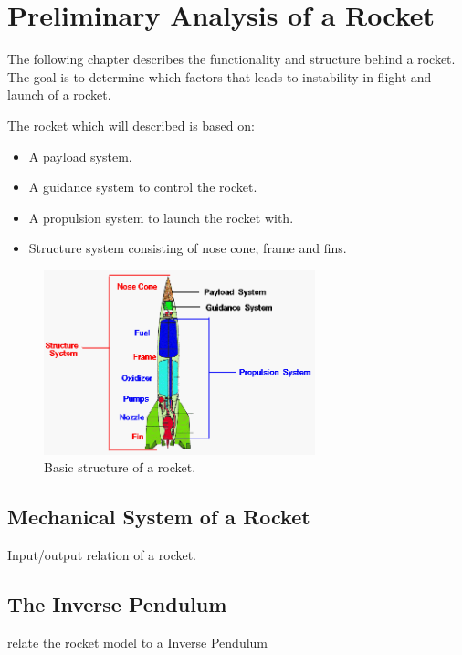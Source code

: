 \chapter{Preliminary Analysis of a Rocket}
The following chapter describes the functionality and structure behind a rocket. The goal is to determine which factors that leads to instability in flight and launch of a rocket. 
\bigbreak

The rocket which will described is based on:
\begin{itemize}[noitemsep]
\item A payload system.
\item A guidance system to control the rocket.
\item A propulsion system to launch the rocket with. 
\item Structure system consisting of nose cone, frame and fins.
\end{itemize}    

\begin{figure}[htbp]
	\centering
 	\includegraphics[width=0.7\textwidth]{figures/RocketStructure.png} 
 	\caption{Basic structure of a rocket.}
 	\label{fig:RocketStructure}
\end{figure}



\section{Mechanical System of a Rocket}
Input/output relation of a rocket.
\section{The Inverse Pendulum}
relate the rocket model to a Inverse Pendulum